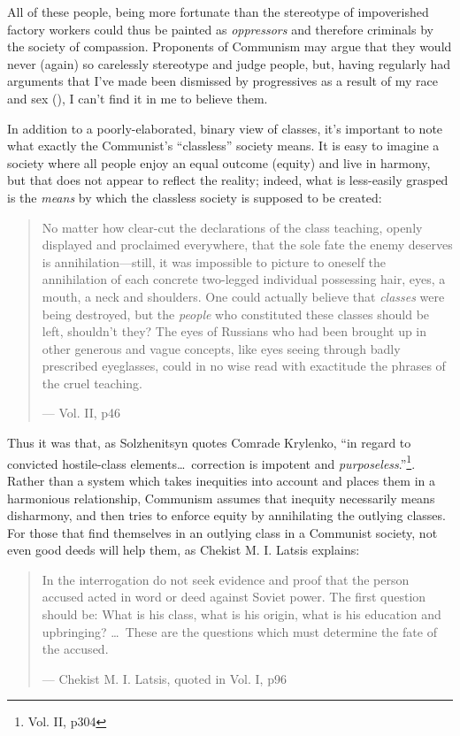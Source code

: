 \documentclass{article}
\begin{document}
All of these people, being more fortunate than the stereotype of impoverished factory workers could thus be painted as \emph{oppressors} and therefore criminals by the society of compassion.  Proponents of Communism may argue that they would never (again) so carelessly stereotype and judge people, but, having regularly had arguments that I've made been dismissed by progressives as a result of my race and sex (), I can't find it in me to believe them.

In addition to a poorly-elaborated, binary view of classes, it's important to note what exactly the Communist's ``classless'' society means.  It is easy to imagine a society where all people enjoy an equal outcome (equity) and live in harmony, but that does not appear to reflect the reality; indeed, what is less-easily grasped is the \emph{means} by which the classless society is supposed to be created:

\begin{quote}
No matter how clear-cut the declarations of the class teaching, openly displayed and proclaimed everywhere, that the sole fate the enemy deserves is annihilation---still, it was impossible to picture to oneself the annihilation of each concrete two-legged individual possessing hair, eyes, a mouth, a neck and shoulders.  One could actually believe that \emph{classes} were being destroyed, but the \emph{people} who constituted these classes should be left, shouldn't they?  The eyes of Russians who had been brought up in other generous and vague concepts, like eyes seeing through badly prescribed eyeglasses, could in no wise read with exactitude the phrases of the cruel teaching.

--- Vol. II, p46
\end{quote}

Thus it was that, as Solzhenitsyn quotes Comrade Krylenko, ``in regard to convicted hostile-class elements\ldots~correction is impotent and \emph{purposeless}.''\footnote{Vol. II, p304}.  Rather than a system which takes inequities into account and places them in a harmonious relationship, Communism assumes that inequity necessarily means disharmony, and then tries to enforce equity by annihilating the outlying classes.  For those that find themselves in an outlying class in a Communist society, not even good deeds will help them, as Chekist M. I. Latsis explains:

\begin{quote}
In the interrogation do not seek evidence and proof that the person accused acted in word or deed against Soviet power.  The first question should be: What is his class, what is his origin, what is his education and upbringing?  \ldots~These are the questions which must determine the fate of the accused.

--- Chekist M. I. Latsis, quoted in Vol. I, p96
\end{quote}
\end{document}
